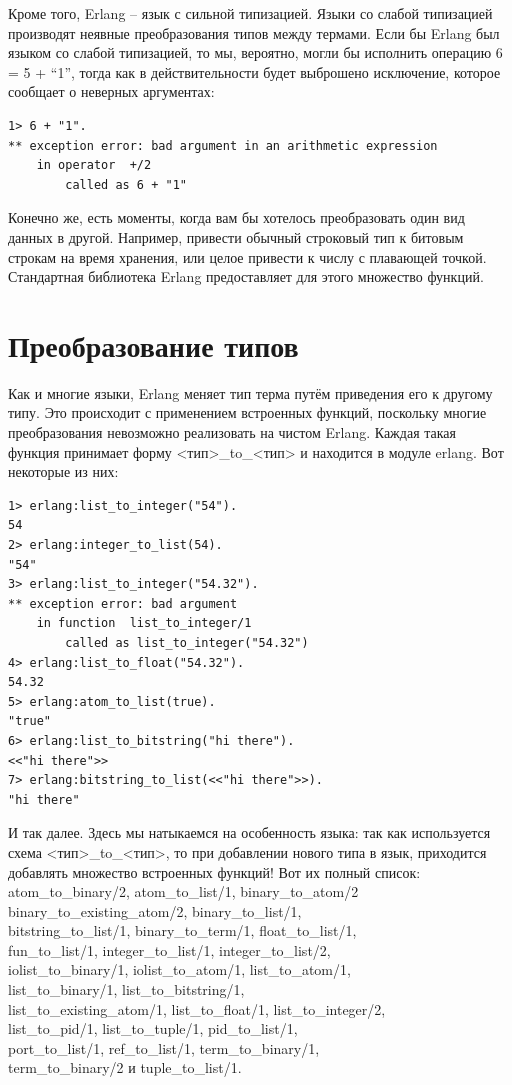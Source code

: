\documentclass[a4paper,12pt]{report}
\newcommand{\ops}{\colorbox{lgreen}}
\begin{document}
Кроме того, Erlang \--- язык с сильной типизацией. Языки со слабой типизацией производят неявные преобразования типов между термами. Если бы Erlang был языком со слабой типизацией, то мы, вероятно, могли бы исполнить операцию \ops{6 = 5 + ``1''}, тогда как в действительности будет выброшено исключение, которое сообщает о неверных аргументах:
\begin{lstlisting}[style=erlang]
1> 6 + "1".
** exception error: bad argument in an arithmetic expression
    in operator  +/2
        called as 6 + "1"
\end{lstlisting}

Конечно же, есть моменты, когда вам бы хотелось преобразовать один вид данных в другой. Например, привести обычный строковый тип к битовым строкам на время хранения, или целое привести к числу с плавающей точкой. Стандартная библиотека Erlang предоставляет для этого множество функций.
\section{Преобразование типов}
Как и многие языки, Erlang меняет тип терма путём приведения его к другому типу. Это происходит с применением встроенных функций, поскольку многие преобразования невозможно реализовать на чистом Erlang. Каждая такая функция принимает форму <тип>\_to\_<тип> и находится в модуле \ops{erlang}. Вот некоторые из них:
\begin{lstlisting}[style=erlang]
1> erlang:list_to_integer("54").
54
2> erlang:integer_to_list(54).
"54"
3> erlang:list_to_integer("54.32").
** exception error: bad argument
    in function  list_to_integer/1
        called as list_to_integer("54.32")
4> erlang:list_to_float("54.32").
54.32
5> erlang:atom_to_list(true).
"true"
6> erlang:list_to_bitstring("hi there").
<<"hi there">>
7> erlang:bitstring_to_list(<<"hi there">>).
"hi there"
\end{lstlisting}

И так далее. Здесь мы натыкаемся на особенность языка: так как используется схема <тип>\_to\_<тип>, то при добавлении нового типа в язык, приходится добавлять множество встроенных функций! Вот их полный список:
\ops{atom\_to\_binary/2, atom\_to\_list/1, binary\_to\_atom/2}\\
\ops{binary\_to\_existing\_atom/2, binary\_to\_list/1,}\\
\ops{bitstring\_to\_list/1, binary\_to\_term/1, float\_to\_list/1,}\\
\ops{fun\_to\_list/1, integer\_to\_list/1, integer\_to\_list/2,}\\
\ops{iolist\_to\_binary/1, iolist\_to\_atom/1, list\_to\_atom/1,}\\
\ops{list\_to\_binary/1, list\_to\_bitstring/1,}\\
\ops{list\_to\_existing\_atom/1, list\_to\_float/1, list\_to\_integer/2,}\\
\ops{list\_to\_pid/1, list\_to\_tuple/1, pid\_to\_list/1,}\\
\ops{port\_to\_list/1, ref\_to\_list/1, term\_to\_binary/1,}\\
\ops{term\_to\_binary/2 и tuple\_to\_list/1.}
\end{document}
